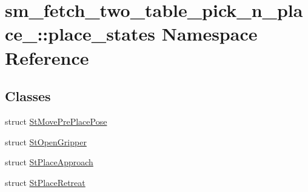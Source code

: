\hypertarget{namespacesm__fetch__two__table__pick__n__place__1_1_1place__states}{}\section{sm\+\_\+fetch\+\_\+two\+\_\+table\+\_\+pick\+\_\+n\+\_\+place\+\_\+:\+:place\+\_\+states Namespace Reference}
\label{namespacesm__fetch__two__table__pick__n__place__1_1_1place__states}
\subsection*{Classes}
\begin{DoxyCompactItemize}
\item 
struct \hyperlink{structsm__fetch__two__table__pick__n__place__1_1_1place__states_1_1StMovePrePlacePose}{St\+Move\+Pre\+Place\+Pose}
\item 
struct \hyperlink{structsm__fetch__two__table__pick__n__place__1_1_1place__states_1_1StOpenGripper}{St\+Open\+Gripper}
\item 
struct \hyperlink{structsm__fetch__two__table__pick__n__place__1_1_1place__states_1_1StPlaceApproach}{St\+Place\+Approach}
\item 
struct \hyperlink{structsm__fetch__two__table__pick__n__place__1_1_1place__states_1_1StPlaceRetreat}{St\+Place\+Retreat}
\end{DoxyCompactItemize}
